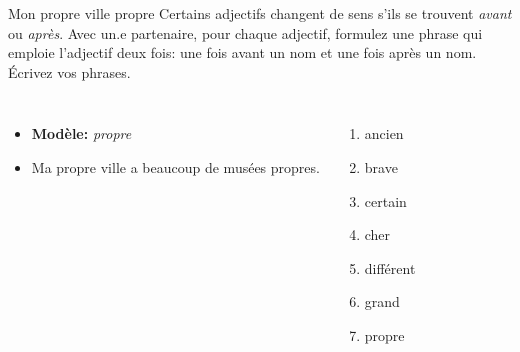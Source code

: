 \begin{frame}{Mon propre ville propre}
  Certains adjectifs changent de sens s'ils se trouvent \emph{avant} ou \emph{après}.
  Avec un.e partenaire, pour chaque adjectif, formulez une phrase qui emploie l'adjectif deux fois: une fois avant un nom et une fois après un nom.
  Écrivez vos phrases.
  \begin{columns}
      \begin{itemize}
        \item[] \textbf{Modèle:} \emph{propre}
        \item Ma propre ville a beaucoup de musées propres.
      \end{itemize}
      \begin{enumerate}
        \item ancien
        \item brave
        \item certain
        \item cher
        \item différent
        \item grand
        \item propre
      \end{enumerate}
  \end{columns}
\end{frame}